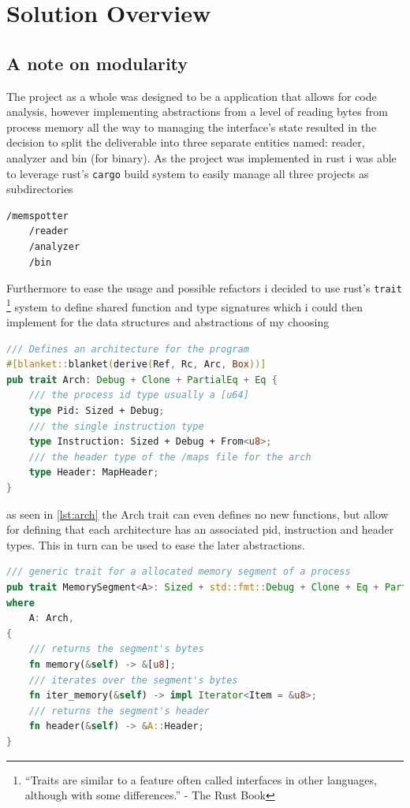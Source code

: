 \chapter{Solution Overview}
\label{cha:implementation}


\section{A note on modularity}

The project as a whole was designed to be a application that allows for code analysis, however implementing abstractions from a level of reading bytes from process memory all the way to managing the interface's state resulted in the decision to split the deliverable into three separate entities named: reader, analyzer and bin (for binary). As the project was implemented in rust i was able to leverage rust's \verb|cargo| build system to easily manage all three projects as subdirectories

\begin{lstlisting}[caption="The basic project structure"]
/memspotter
    /reader
    /analyzer
    /bin
\end{lstlisting}

Furthermore to ease the usage and possible refactors i decided to use rust's \verb|trait| \footnote{\enquote{Traits are similar to a feature often called interfaces in other languages, although with some differences.} - The Rust Book} system to define shared function and type signatures which i could then implement for the data structures and abstractions of my choosing

\begin{lstlisting}[caption=\label{lst:arch}"a trait definition example", language=Rust,]
/// Defines an architecture for the program
#[blanket::blanket(derive(Ref, Rc, Arc, Box))]
pub trait Arch: Debug + Clone + PartialEq + Eq {
    /// the process id type usually a [u64]
    type Pid: Sized + Debug;
    /// the single instruction type
    type Instruction: Sized + Debug + From<u8>;
    /// the header type of the /maps file for the arch
    type Header: MapHeader;
}    
\end{lstlisting}

as seen in \ref{lst:arch} the Arch trait can even defines no new functions, but allow for defining that each architecture has an associated pid, instruction and header types. This in turn can be used to ease the later abstractions. 

\begin{lstlisting}[caption=\label{lst:segment}"The memory segment trait", language=Rust]
/// generic trait for a allocated memory segment of a process
pub trait MemorySegment<A>: Sized + std::fmt::Debug + Clone + Eq + PartialEq
where
    A: Arch,
{
    /// returns the segment's bytes
    fn memory(&self) -> &[u8];
    /// iterates over the segment's bytes
    fn iter_memory(&self) -> impl Iterator<Item = &u8>;
    /// returns the segment's header
    fn header(&self) -> &A::Header;
}
\end{lstlisting}

